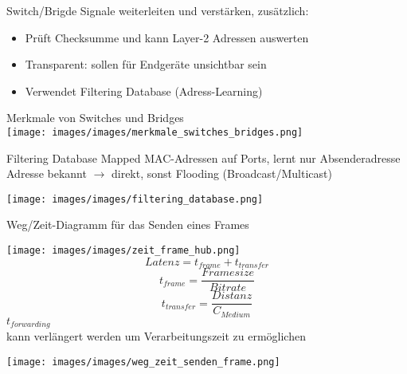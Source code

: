 \begin{definition}{Switch/Brigde} Signale weiterleiten und verstärken, zusätzlich:
    \begin{itemize}
        \item Prüft Checksumme und kann Layer-2 Adressen auswerten
        \item Transparent: sollen für Endgeräte unsichtbar sein
        \item Verwendet Filtering Database (Adress-Learning)
    \end{itemize}
\end{definition}

\begin{theorem}{Merkmale von Switches und Bridges}\\
    \texttt{[image: images/images/merkmale\_switches\_bridges.png]}
\end{theorem}


\begin{definition}{Filtering Database}
    Mapped MAC-Adressen auf Ports, lernt nur Absenderadresse \\
    Adresse bekannt $\rightarrow$ direkt, sonst Flooding (Broadcast/Multicast)\\
    \begin{centering}
        \texttt{[image: images/images/filtering\_database.png]}    
    \end{centering}
\end{definition}

\begin{KR}{Weg/Zeit-Diagramm für das Senden eines Frames}\\
    \begin{minipage}{0.5\linewidth}
        \texttt{[image: images/images/zeit\_frame\_hub.png]} 
        $$Latenz = t_{frame} + t_{transfer}$$
        $$t_{frame} = \frac{Framesize}{Bitrate}$$
        $$t_{transfer} = \frac{Distanz}{C_{Medium}}$$
        $t_{forwarding}$ \\kann verlängert werden um Verarbeitungszeit zu ermöglichen
    \end{minipage}
    \begin{minipage}{0.5\linewidth}
        \texttt{[image: images/images/weg\_zeit\_senden\_frame.png]}
    \end{minipage}
\end{KR}

